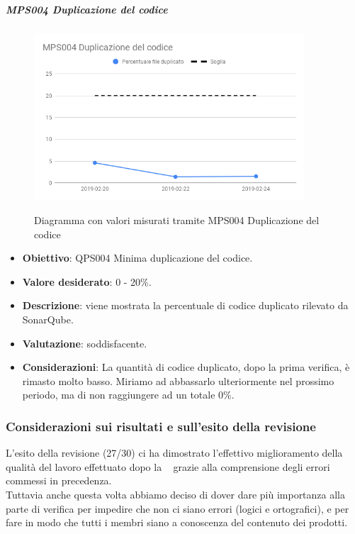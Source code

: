     \subparagraph{MPS004 Duplicazione del codice}

    \begin{figure}[H]
        \centering
        \includegraphics[width=0.9\textwidth]{img/cruscotti/RP/MPS004.png}
        \label{immaginePresenzaDupplicazioneCodiceRP}
        \caption{Diagramma con valori misurati tramite MPS004 Duplicazione del codice}
    \end{figure}

    \begin{itemize}
        \item \textbf{Obiettivo}: QPS004 Minima duplicazione del codice.
        \item \textbf{Valore desiderato}: 0 - 20\%.
        \item \textbf{Descrizione}: viene mostrata la percentuale di codice duplicato rilevato da SonarQube.
        \item \textbf{Valutazione}: soddisfacente.
        \item \textbf{Considerazioni}: La quantità di codice duplicato, dopo la prima verifica, è rimasto molto basso. Miriamo ad abbassarlo ulteriormente nel prossimo periodo, ma di non raggiungere ad un totale 0\%.
    \end{itemize}

	\subsubsection{Considerazioni sui risultati e sull'esito della revisione}
    L'esito della revisione (27/30) ci ha dimostrato l'effettivo miglioramento della qualità del lavoro effettuato dopo la \RR~ grazie alla comprensione degli errori commessi in precedenza.\\
    Tuttavia anche questa volta abbiamo deciso di dover dare più importanza alla parte di verifica per impedire che non ci siano errori (logici e ortografici), e per fare in modo che tutti i membri siano a conoscenza del contenuto dei prodotti.
    
